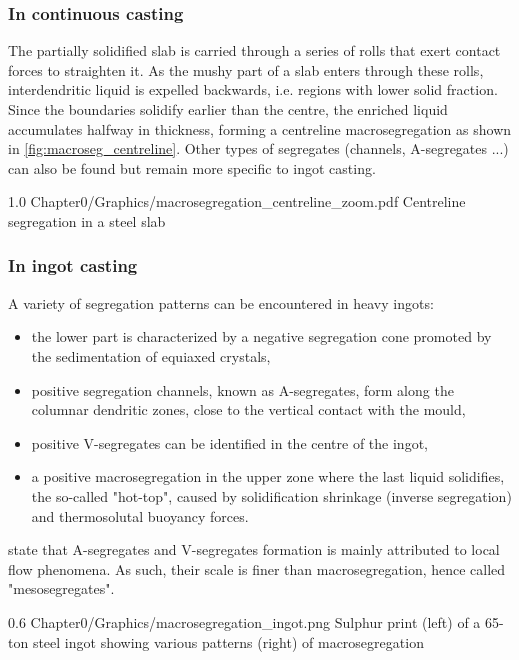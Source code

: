 \subsubsection*{In continuous casting}
%
The partially solidified slab is carried through a series of rolls that exert contact forces to straighten it.
As the mushy part of a slab enters through these rolls, interdendritic liquid is expelled backwards, i.e. regions with lower solid fraction.
Since the boundaries solidify earlier than the centre, the enriched liquid accumulates halfway in thickness, forming a centreline macrosegregation
as shown in \cref{fig:macroseg_centreline}. Other types of segregates (channels, A-segregates ...) can also be found but remain more specific to ingot casting. 
\begin{figureth}
{1.0}
{Chapter0/Graphics/macrosegregation_centreline_zoom.pdf}
{Centreline segregation in a steel slab \citep{beckermann_modelling_2002}}
\label{fig:macroseg_centreline}
\end{figureth}
%
%
\subsubsection*{In ingot casting}
A variety of segregation patterns can be encountered in heavy ingots: 
\begin{itemize}
\itemsep0em 
\item the lower part is characterized by a negative segregation cone promoted by the sedimentation of 
	  equiaxed crystals,
\item positive segregation channels, known as A-segregates, form along the columnar dendritic zones, close to the vertical contact with the mould,
\item positive V-segregates can be identified in the centre of the ingot,
\item a positive macrosegregation in the upper zone where the last liquid solidifies, the so-called "hot-top", caused by solidification shrinkage (inverse segregation)
	  and thermosolutal buoyancy forces. 
\end{itemize}
\citet{combeau_prediction_2009} state that A-segregates and V-segregates formation is mainly attributed to local flow phenomena.
As such, their scale is finer than macrosegregation, hence called "mesosegregates".
\begin{figureth}
{0.6}
{Chapter0/Graphics/macrosegregation_ingot.png}
{Sulphur print (left) of a 65-ton steel ingot \citep{lesoult_macrosegregation_2005} showing various patterns (right) of macrosegregation \citep{flemings_solidification_1974}}
\label{macrosegregation_ingot}
\end{figureth}
%
%
